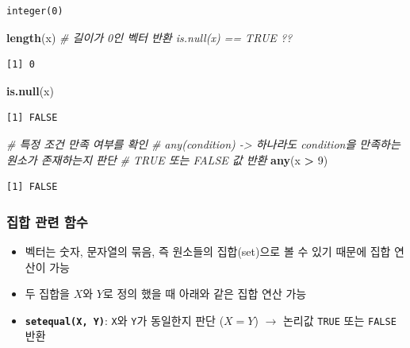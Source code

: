 \documentclass[
  11pt,
]{krantz}
\newenvironment{Shaded}{\begin{snugshade}}{\end{snugshade}}
\newcommand{\CommentTok}[1]{\textcolor[rgb]{0.37,0.37,0.37}{\textit{#1}}}
\newcommand{\DecValTok}[1]{\textcolor[rgb]{0.06,0.06,0.06}{#1}}
\newcommand{\KeywordTok}[1]{\textcolor[rgb]{0.27,0.27,0.27}{\textbf{#1}}}
\newcommand{\NormalTok}[1]{#1}
\newcommand{\OperatorTok}[1]{\textcolor[rgb]{0.43,0.43,0.43}{\textbf{#1}}}
\newcommand{\StringTok}[1]{\textcolor[rgb]{0.5,0.5,0.5}{#1}}
\providecommand{\tightlist}{%
  \setlength{\itemsep}{0pt}\setlength{\parskip}{0pt}}
\begin{document}
\begin{verbatim}
integer(0)
\end{verbatim}

\begin{Shaded}
\begin{Highlighting}[]
\KeywordTok{length}\NormalTok{(x) }\CommentTok{# 길이가 0인 벡터 반환 is.null(x) == TRUE ??}
\end{Highlighting}
\end{Shaded}

\begin{verbatim}
[1] 0
\end{verbatim}

\begin{Shaded}
\begin{Highlighting}[]
\KeywordTok{is.null}\NormalTok{(x)}
\end{Highlighting}
\end{Shaded}

\begin{verbatim}
[1] FALSE
\end{verbatim}

\begin{Shaded}
\begin{Highlighting}[]
\CommentTok{# 특정 조건 만족 여부를 확인 }
\CommentTok{# any(condition) -> 하나라도 condition을 만족하는 원소가 존재하는지 판단}
\CommentTok{# TRUE 또는 FALSE 값 반환}
\KeywordTok{any}\NormalTok{(x }\OperatorTok{>}\StringTok{ }\DecValTok{9}\NormalTok{)}
\end{Highlighting}
\end{Shaded}

\begin{verbatim}
[1] FALSE
\end{verbatim}

\normalsize

\hypertarget{set-function}{%
\subsubsection{\texorpdfstring{\textbf{집합 관련 함수}}{집합 관련 함수}}\label{set-function}}

\begin{itemize}
\tightlist
\item
  벡터는 숫자, 문자열의 묶음, 즉 원소들의 집합(set)으로 볼 수 있기 때문에 집합 연산이 가능
\item
  두 집합을 \(X\)와 \(Y\)로 정의 했을 때 아래와 같은 집합 연산 가능
\item
  \textbf{\texttt{setequal(X,\ Y)}}: \texttt{X}와 \texttt{Y}가 동일한지 판단 (\(X = Y\)) \(\rightarrow\) 논리값 \texttt{TRUE} 또는 \texttt{FALSE} 반환
\end{itemize}
\end{document}
